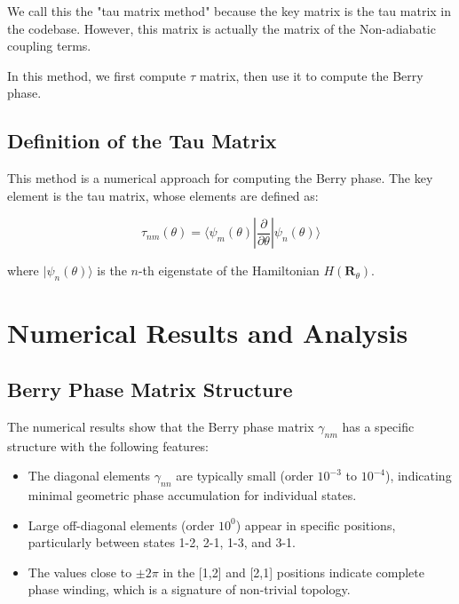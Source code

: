 \documentclass{article}
\begin{document}
We call this the "tau matrix method" because the key matrix is the tau matrix in the codebase. However, this matrix is actually the matrix of the Non-adiabatic coupling terms.

In this method, we first compute $\tau$ matrix, then use it to compute the Berry phase.

\subsection{Definition of the Tau Matrix}

This method is a numerical approach for computing the Berry phase. The key element is the tau matrix, whose elements are defined as:

\begin{equation}
\tau_{nm}(\theta) = \langle \psi_m(\theta) | \frac{\partial}{\partial\theta} | \psi_n(\theta) \rangle
\end{equation}

where $|\psi_n(\theta)\rangle$ is the $n$-th eigenstate of the Hamiltonian $H(\bm{R}_\theta)$.

\section{Numerical Results and Analysis}

\subsection{Berry Phase Matrix Structure}

The numerical results show that the Berry phase matrix $\gamma_{nm}$ has a specific structure with the following features:

\begin{itemize}
    \item The diagonal elements $\gamma_{nn}$ are typically small (order $10^{-3}$ to $10^{-4}$), indicating minimal geometric phase accumulation for individual states.
    
    \item Large off-diagonal elements (order $10^0$) appear in specific positions, particularly between states 1-2, 2-1, 1-3, and 3-1.
    
    \item The values close to $\pm 2\pi$ in the [1,2] and [2,1] positions indicate complete phase winding, which is a signature of non-trivial topology.
\end{itemize}
\end{document}
